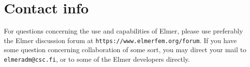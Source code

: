 \section*{Contact info}

For questions concerning the use and capabilities of Elmer, 
please use preferably the Elmer discussion forum at \texttt{https://www.elmerfem.org/forum}.
If you have some question concerning collaboration of some sort, you may direct your mail to
\texttt{elmeradm@csc.fi}, or to some of the Elmer developers directly. 

